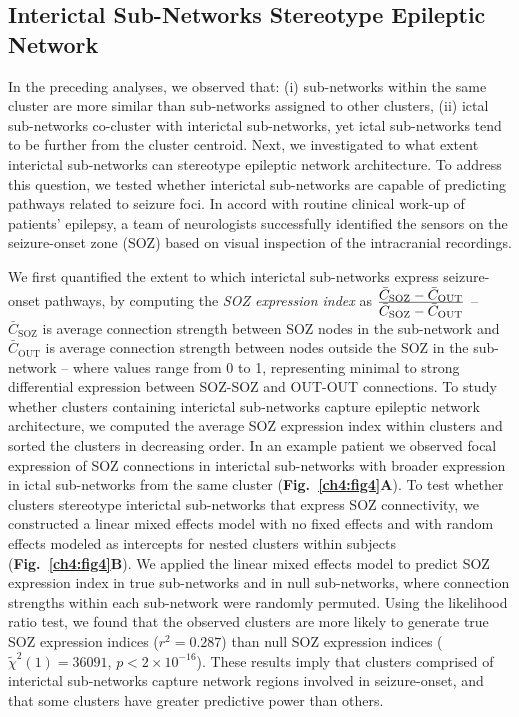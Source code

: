 \subsection{Interictal Sub-Networks Stereotype Epileptic Network}
In the preceding analyses, we observed that: (i) sub-networks within the same cluster are more similar than sub-networks assigned to other clusters, (ii) ictal sub-networks co-cluster with interictal sub-networks, yet ictal sub-networks tend to be further from the cluster centroid. Next, we investigated to what extent interictal sub-networks can stereotype epileptic network architecture. To address this question, we tested whether interictal sub-networks are capable of predicting pathways related to seizure foci. In accord with routine clinical work-up of patients' epilepsy, a team of neurologists successfully identified the sensors on the seizure-onset zone (SOZ) based on visual inspection of the intracranial recordings. 

We first quantified the extent to which interictal sub-networks express seizure-onset pathways, by computing the \textit{SOZ expression index} as $\frac{\displaystyle \bar{C}_\textrm{SOZ}-\bar{C}_\textrm{OUT}}{\displaystyle \bar{C}_\textrm{SOZ}-\bar{C}_\textrm{OUT}}$ -- $\bar{C}_\textrm{SOZ}$ is average connection strength between SOZ nodes in the sub-network and$ \bar{C}_\textrm{OUT}$ is average connection strength between nodes outside the SOZ in the sub-network -- where values range from 0 to 1, representing minimal to strong differential expression between SOZ-SOZ and OUT-OUT connections. To study whether clusters containing interictal sub-networks capture epileptic network architecture, we computed the average SOZ expression index within clusters and sorted the clusters in decreasing order. In an example patient we observed focal expression of SOZ connections in interictal sub-networks with broader expression in ictal sub-networks from the same cluster (\textbf{Fig.~\ref{ch4:fig4}A}). To test whether clusters stereotype interictal sub-networks that express SOZ connectivity, we constructed a linear mixed effects model with no fixed effects and with random effects modeled as intercepts for nested clusters within subjects (\textbf{Fig.~\ref{ch4:fig4}B}). We applied the linear mixed effects model to predict SOZ expression index in true sub-networks and in null sub-networks, where connection strengths within each sub-network were randomly permuted. Using the likelihood ratio test, we found that the observed clusters are more likely to generate true SOZ expression indices ($r^2=0.287$) than null SOZ expression indices ($\tilde{\chi}^2(1)=36091$, $p<2\times10^{-16}$). These results imply that clusters comprised of interictal sub-networks capture network regions involved in seizure-onset, and that some clusters have greater predictive power than others.

